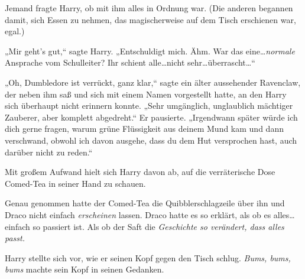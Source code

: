 Jemand fragte Harry, ob mit ihm alles in Ordnung war. (Die anderen begannen damit, sich Essen zu nehmen, das magischerweise auf dem Tisch erschienen war, egal.)

„Mir geht’s gut,“ sagte Harry. „Entschuldigt mich. Ähm. War das eine…\emph{normale} Ansprache vom Schulleiter? Ihr schient alle…nicht sehr…überrascht…“

„Oh, Dumbledore ist verrückt, ganz klar,“ sagte ein älter aussehender Ravenclaw, der neben ihm saß und sich mit einem Namen vorgestellt hatte, an den Harry sich überhaupt nicht erinnern konnte. „Sehr umgänglich, unglaublich mächtiger Zauberer, aber komplett abgedreht.“ Er pausierte. „Irgendwann später würde ich dich gerne fragen, warum grüne Flüssigkeit aus deinem Mund kam und dann verschwand, obwohl ich davon ausgehe, dass du dem Hut versprochen hast, auch darüber nicht zu reden.“

Mit großem Aufwand hielt sich Harry davon ab, auf die verräterische Dose Comed-Tea in seiner Hand zu schauen.

Genau genommen hatte der Comed-Tea die Quibblerschlagzeile über ihn und Draco nicht einfach \emph{erscheinen} lassen. Draco hatte es so erklärt, als ob es alles…einfach so passiert ist. Als ob der Saft die \emph{Geschichte so verändert, dass alles passt.}

Harry stellte sich vor, wie er seinen Kopf gegen den Tisch schlug. \emph{Bums, bums, bums} machte sein Kopf in seinen Gedanken.

